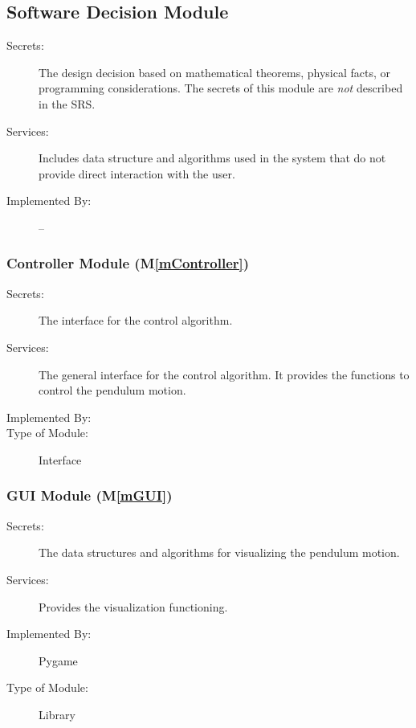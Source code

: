 \documentclass[12pt, titlepage]{article}
\newcommand{\mref}[1]{M\ref{#1}}
\begin{document}


\subsection{Software Decision Module}

\begin{description}
\item[Secrets:] The design decision based on mathematical theorems, physical
  facts, or programming considerations. The secrets of this module are
  \emph{not} described in the SRS.
\item[Services:] Includes data structure and algorithms used in the system that
  do not provide direct interaction with the user. 
\item[Implemented By:] --
\end{description}

\subsubsection{Controller Module (\mref{mController})}

\begin{description}
\item[Secrets:] The interface for the control algorithm.
\item[Services:] The general interface for the control algorithm. It provides the
                 functions to control the pendulum motion.
\item[Implemented By:] \progname{}
\item[Type of Module:] Interface
\end{description}

\subsubsection{GUI Module (\mref{mGUI})}

\begin{description}
\item[Secrets:] The data structures and algorithms for visualizing the pendulum motion.
\item[Services:] Provides the visualization functioning.
\item[Implemented By:] Pygame
\item[Type of Module:] Library
\end{description}
\end{document}
